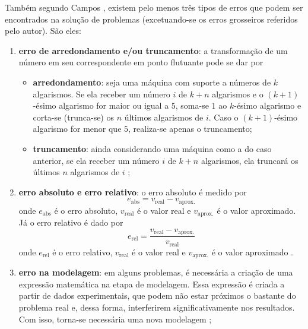         Também segundo Campos \cite{fred}, existem pelo menos três tipos de erros que podem ser encontrados na solução de problemas (excetuando-se os erros grosseiros referidos pelo autor). São eles:
        \begin{enumerate}
            \item \textbf{erro de arredondamento e/ou truncamento}: a transformação de um número em seu correspondente em ponto flutuante pode se dar por 
            \begin{itemize}
                \item \textbf{arredondamento}: seja uma máquina com suporte a números de $k$ algarismos. Se ela receber um número $i$ de $k + n$ algarismos e o $(k + 1)$-ésimo algarismo for maior ou igual a $5$, soma-se $1$ ao $k$-ésimo algarismo e corta-se (trunca-se) os $n$ últimos algarismos de $i$. Caso o $(k + 1)$-ésimo algarismo for menor que $5$, realiza-se apenas o truncamento;
                \item \textbf{truncamento}: ainda considerando uma máquina como a do caso anterior, se ela receber um número $i$ de $k + n$ algarismos, ela truncará os últimos $n$ algarismos de $i$ \cite{burden};
            \end{itemize}
            \item \textbf{erro absoluto e erro relativo}: o erro absoluto é medido por \begin{equation}
                e_{\text{abs}} = v_{\text{real}} - v_{\text{aprox.}}
            \end{equation}
            onde $e_{\text{abs}}$ é o erro absoluto, $v_{\text{real}}$ é o valor real e $v_{\text{aprox.}}$ é o valor aproximado. Já o erro relativo é dado por
            \begin{equation}
                e_{\text{rel}} = \dfrac{v_{\text{real}} - v_{\text{aprox.}}}{v_{\text{real}}}
            \end{equation}
            onde $e_{\text{rel}}$ é o erro relativo, $v_{\text{real}}$ é o valor real e $v_{\text{aprox.}}$ é o valor aproximado \cite{fred}.
            \item \textbf{erro na modelagem}: em alguns problemas, é necessária a criação de uma expressão matemática na etapa de modelagem. Essa expressão é criada a partir de dados experimentais, que podem não estar próximos o bastante do problema real e, dessa forma, interferirem significativamente nos resultados. Com isso, torna-se necessária uma nova modelagem \cite{fred};
        \end{enumerate}
    